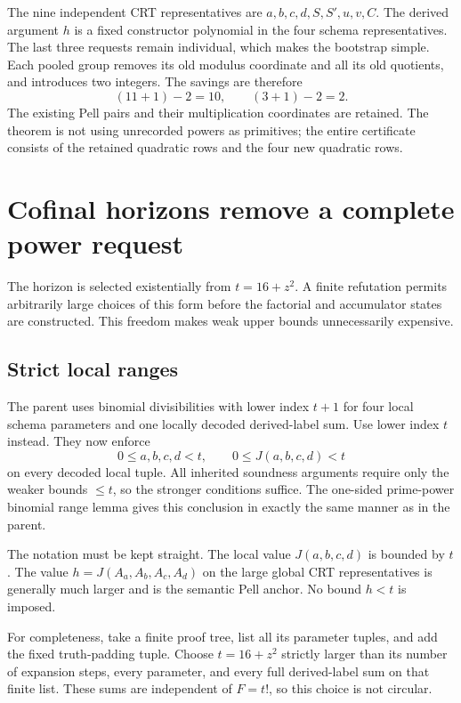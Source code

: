\documentclass[11pt,letterpaper]{article}
\theoremstyle{definition}\newtheorem{definition}[theorem]{Definition}
\theoremstyle{remark}\newtheorem{remark}[theorem]{Remark}
\begin{document}
The nine independent CRT representatives are
\(a,b,c,d,S,S',u,v,C\). The derived argument \(h\) is a fixed
constructor polynomial in the four schema representatives. The last
three requests remain individual, which makes the bootstrap simple.
Each pooled group removes its old modulus coordinate and all its old
quotients, and introduces two integers. The savings are therefore
\[
(11+1)-2=10,\qquad(3+1)-2=2.
\]
The existing Pell pairs and their multiplication coordinates are retained.
The theorem is not using unrecorded powers as primitives; the entire
certificate consists of the retained quadratic rows and the four new
quadratic rows.

\section{Cofinal horizons remove a complete power request}
\label{sec:strict}

The horizon is selected existentially from
\(t=16+z^2\). A finite refutation permits arbitrarily large choices of
this form before the factorial and accumulator states are constructed.
This freedom makes weak upper bounds unnecessarily expensive.

\subsection{Strict local ranges}

The parent uses binomial divisibilities with lower index \(t+1\) for
four local schema parameters and one locally decoded derived-label sum.
Use lower index \(t\) instead. They now enforce
\[
0\le a,b,c,d<t,\qquad 0\le J(a,b,c,d)<t
\]
on every decoded local tuple. All inherited soundness arguments require
only the weaker bounds \(\le t\), so the stronger conditions suffice.
The one-sided prime-power binomial range lemma gives this conclusion
in exactly the same manner as in the parent.

The notation must be kept straight. The local value \(J(a,b,c,d)\) is
bounded by \(t\). The value \(h=J(A_a,A_b,A_c,A_d)\) on the large
global CRT representatives is generally much larger and is the semantic
Pell anchor. No bound \(h<t\) is imposed.

For completeness, take a finite proof tree, list all its parameter tuples,
and add the fixed truth-padding tuple. Choose \(t=16+z^2\) strictly larger
than its number of expansion steps, every parameter, and every full
derived-label sum on that finite list. These sums are independent of
\(F=t!\), so this choice is not circular.
\end{document}
